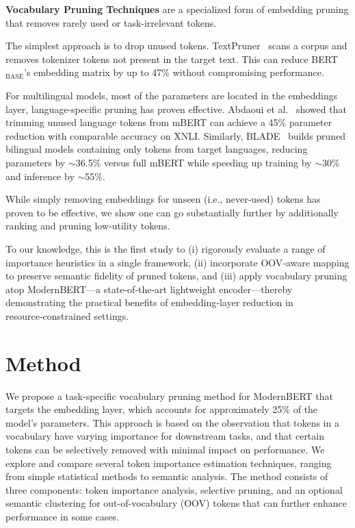 \documentclass[twocolumn]{article}
\begin{document}
\textbf{Vocabulary Pruning Techniques} are a specialized form of embedding pruning that removes rarely used or task-irrelevant tokens.

The simplest approach is to drop unused tokens. TextPruner~\cite{shen2022textpruner} scans a corpus and removes tokenizer tokens not present in the target text. This can reduce BERT$_{\text{BASE}}$'s embedding matrix by up to 47\% without compromising performance.

For multilingual models, most of the parameters are located in the embeddings layer, language-specific pruning has proven effective. Abdaoui et al.~\cite{abdaoui2020load} showed that trimming unused language tokens from mBERT can achieve a 45\% parameter reduction with comparable accuracy on XNLI. Similarly, BLADE~\cite{nair2023blade} builds pruned bilingual models containing only tokens from target languages, reducing parameters by $\sim$36.5\% versus full mBERT while speeding up training by $\sim$30\% and inference by $\sim$55\%.

While simply removing embeddings for unseen (i.e., never‑used) tokens has proven to be effective, we show one can go substantially further by additionally ranking and pruning low‑utility tokens. 

To our knowledge, this is the first study to (i) rigorously evaluate a range of importance heuristics in a single framework, (ii) incorporate OOV‑aware mapping to preserve semantic fidelity of pruned tokens, and (iii) apply vocabulary pruning atop ModernBERT—a state‑of‑the‑art lightweight encoder—thereby demonstrating the practical benefits of embedding‑layer reduction in resource‑constrained settings.

\newpage
\section{Method}
We propose a task-specific vocabulary pruning method for ModernBERT that targets the embedding layer, which accounts for approximately 25\% of the model's parameters. This approach is based on the observation that tokens in a vocabulary have varying importance for downstream tasks, and that certain tokens can be selectively removed with minimal impact on performance. We explore and compare several token importance estimation techniques, ranging from simple statistical methods to semantic analysis. The method consists of three components: token importance analysis, selective pruning, and an optional semantic clustering for out-of-vocabulary (OOV) tokens that can further enhance performance in some cases.
\end{document}
